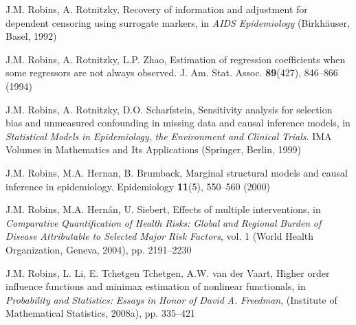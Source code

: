 \begin{list}{}{\setlength{\leftmargin}{2.1em}\setlength{\labelwidth}{0pt}
  \setlength{\labelsep}{0pt}\setlength{\itemindent}{-2.1em}
  \setlength{\parsep}{0pt}\setlength{\itemsep}{2pt}\setlength{\topsep}{0pt}}
\item\label{refentry:REF303}J.M. Robins, A. Rotnitzky, Recovery of information and adjustment for dependent censoring using surrogate markers, in \textit{AIDS} \textit{Epidemiology} (Birkhäuser, Basel, 1992)\label{refend:REF303}
\item\label{refentry:REF304}J.M. Robins, A. Rotnitzky, L.P. Zhao, Estimation of regression coefficients when some regressors are not always observed. J. Am. Stat. Assoc. \textbf{89}(427), 846--866 (1994)\label{refend:REF304}
\item\label{refentry:REF305}J.M. Robins, A. Rotnitzky, D.O. Scharfstein, Sensitivity analysis for selection bias and unmeasured confounding in missing data and causal inference models, in \textit{Statistical} \textit{Models} \textit{in} \textit{Epidemiology,} \textit{the} \textit{Environment} \textit{and} \textit{Clinical} \textit{Trials}. IMA Volumes in Mathematics and Its Applications (Springer, Berlin, 1999)\label{refend:REF305}
\item\label{refentry:REF306}J.M. Robins, M.A. Hernan, B. Brumback, Marginal structural models and causal inference in epidemiology. Epidemiology \textbf{11}(5), 550--560 (2000)\label{refend:REF306}
\item\label{refentry:REF307}J.M. Robins, M.A. Hernán, U. Siebert, Effects of multiple interventions, in \textit{Comparative} \textit{Quantification} \textit{of} \textit{Health} \textit{Risks:} \textit{Global} \textit{and} \textit{Regional} \textit{Burden} \textit{of} \textit{Disease} \textit{Attributable} \textit{to} \textit{Selected} \textit{Major} \textit{Risk} \textit{Factors}, vol. 1 (World Health Organization, Geneva, 2004), pp. 2191--2230\label{refend:REF307}
\item\label{refentry:REF308}J.M. Robins, L. Li, E. Tchetgen Tchetgen, A.W. van der Vaart, Higher order influence functions and minimax estimation of nonlinear functionals, in \textit{Probability} \textit{and} \textit{Statistics:} \textit{Essays} \textit{in} \textit{Honor} \textit{of} \textit{David} \textit{A.} \textit{Freedman}, (Institute of Mathematical Statistics, 2008a), pp. 335--421\label{refend:REF308}

\end{list}

